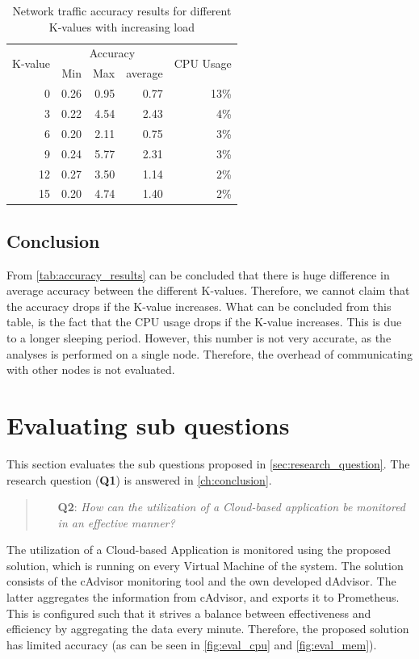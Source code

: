\begin{table}[ht]
    \centering
    \begin{tabular}{r|rrr|r}
        \multirow{2}{*}{K-value} & \multicolumn{3}{c|}{Accuracy} & \multirow{2}{*}{CPU Usage} \\
        & Min & Max & average & \\ \hline  
        0 & 0.26& 0.95& 0.77& 13\% \\
        3 & 0.22& 4.54& 2.43& 4\% \\
        6 & 0.20& 2.11& 0.75& 3\% \\
        9 & 0.24& 5.77& 2.31& 3\% \\
        12& 0.27& 3.50& 1.14& 2\% \\
        15& 0.20& 4.74& 1.40& 2\% \\        
    \end{tabular}
    \caption{Network traffic accuracy results for different K-values with increasing load}
    \label{tab:accuracy_results}
\end{table}

\subsection{Conclusion} \label{sec:accuracy_conclusion}
From \autoref{tab:accuracy_results} can be concluded that there is huge difference in average accuracy between the different K-values. Therefore, we cannot claim that the accuracy drops if the K-value increases. What can be concluded from this table, is the fact that the CPU usage drops if the K-value increases. This is due to a longer sleeping period. However, this number is not very accurate, as the analyses is performed on a single node. Therefore, the overhead of communicating with other nodes is not evaluated.

\section{Evaluating sub questions} \label{sec:subquestions}
This section evaluates the sub questions proposed in \autoref{sec:research_question}. The research question (\textbf{Q1}) is answered in \autoref{ch:conclusion}.

\begin{quote}
    \begin{itemize}
        \item[\textbf{Q2}: ]\textit{How can the utilization of a Cloud-based application be monitored in an effective manner?}
    \end{itemize}
\end{quote}
\noindent
The utilization of a Cloud-based Application is monitored using the proposed solution, which is running on every Virtual Machine of the system. The solution consists of the cAdvisor monitoring tool and the own developed dAdvisor. The latter aggregates the information from cAdvisor, and exports it to Prometheus. This is configured such that it strives a balance between effectiveness and efficiency by aggregating the data every minute. Therefore, the proposed solution has limited accuracy (as can be seen in \autoref{fig:eval_cpu} and \autoref{fig:eval_mem}).


